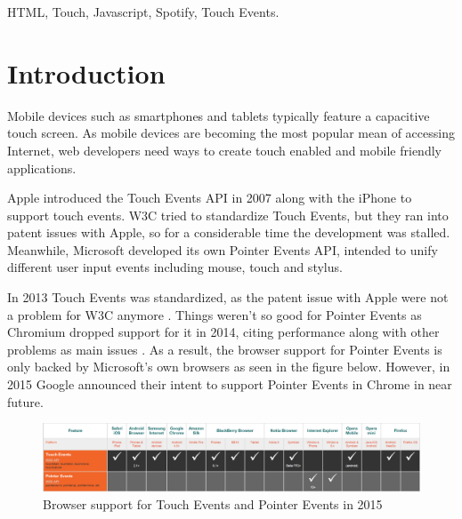 \documentclass[conference]{IEEEtran}
\begin{document}
\begin{IEEEkeywords}
HTML, Touch, Javascript, Spotify, Touch Events.
\end{IEEEkeywords}


%
\IEEEpeerreviewmaketitle

\section{Introduction}

Mobile devices such as smartphones and tablets typically feature a capacitive touch screen. As mobile devices are becoming the most popular mean of accessing Internet, web developers need ways to create touch enabled and mobile friendly applications. 

Apple introduced the Touch Events API in 2007 along with the iPhone to support touch events. W3C tried to standardize Touch Events, but they ran into patent issues with Apple, so for a considerable time the development was stalled. Meanwhile, Microsoft developed its own Pointer Events API, intended to unify different user input events including mouse, touch and stylus. 

In 2013 Touch Events was standardized, as the patent issue with Apple were not a problem for W3C anymore \cite{W3CTouchEvents}. Things weren't so good for Pointer Events as Chromium dropped support for it in 2014, citing performance along with other problems as main issues \cite{CodeGoogle}. As a result, the browser support for Pointer Events is only backed by Microsoft's own browsers as seen in the figure below. However, in 2015 Google announced their intent to support Pointer Events in Chrome in near future. 

\begin{figure}[htbd]
    \centering
    \includegraphics[scale=0.18]{htmltouchevents.png}
    \caption{Browser support for Touch Events and Pointer Events in 2015 \cite{MobileHTML5}}
\end{figure}
\end{document}
